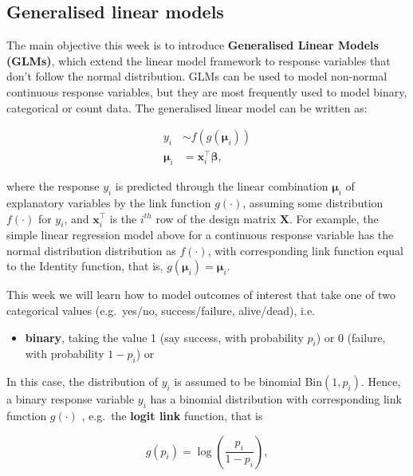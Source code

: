 \documentclass[
  letterpaper,
  DIV=11,
  numbers=noendperiod]{scrartcl}
\providecommand{\tightlist}{%
  \setlength{\itemsep}{0pt}\setlength{\parskip}{0pt}}\usepackage{longtable,booktabs,array}
\begin{document}
\subsection{Generalised linear models}\label{generalised-linear-models}

The main objective this week is to introduce \textbf{Generalised Linear
Models (GLMs)}, which extend the linear model framework to response
variables that don't follow the normal distribution. GLMs can be used to
model non-normal continuous response variables, but they are most
frequently used to model binary, categorical or count data. The
generalised linear model can be written as:

\vspace{-0.5cm}

\begin{align}
y_i &\sim f(g(\boldsymbol{\mu}_i)) \nonumber \\
\boldsymbol{\mu}_i &= \mathbf{x}_i^\top \boldsymbol{\beta}, \nonumber
\end{align}

where the response \(y_i\) is predicted through the linear combination
\(\boldsymbol{\mu}_i\) of explanatory variables by the link function
\(g(\cdot)\), assuming some distribution \(f(\cdot)\) for \(y_i\), and
\(\mathbf{x}_i^\top\) is the \(i^{th}\) row of the design matrix
\(\boldsymbol{X}\). For example, the simple linear regression model
above for a continuous response variable has the normal distribution
distribution as \(f(\cdot)\), with corresponding link function equal to
the Identity function, that is,
\(g(\boldsymbol{\mu}_i) = \boldsymbol{\mu}_i\).

This week we will learn how to model outcomes of interest that take one
of two categorical values (e.g.~yes/no, success/failure, alive/dead),
i.e.

\begin{itemize}
\tightlist
\item
  \textbf{binary}, taking the value 1 (say success, with probability
  \(p_i\)) or 0 (failure, with probability \(1-p_i\)) or
\end{itemize}

In this case, the distribution of \(y_i\) is assumed to be binomial
Bin\((1,p_i)\). Hence, a binary response variable \(y_i\) has a binomial
distribution with corresponding link function \(g(\cdot)\) , e.g.~the
\textbf{logit link} function, that is

\[g(p_i) = \log \left(\frac{p_i}{1 - p_i} \right),\]
\end{document}
